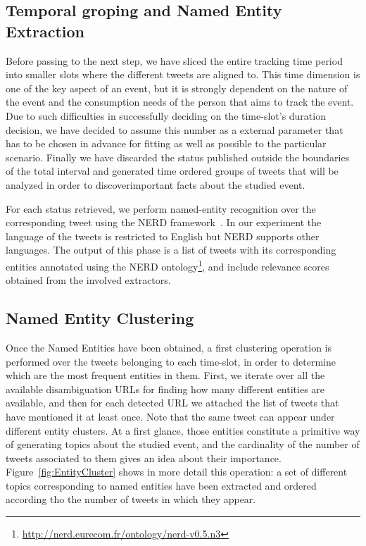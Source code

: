\documentclass{sig-alternate}
\begin{document}
\subsection{Temporal groping and Named Entity Extraction}

Before passing to the next step, we have sliced the entire tracking time period into smaller slots where the different tweets are aligned to. This time dimension is one of the key aspect of an event, but it is strongly dependent on the nature of the event and the consumption needs of the person that aims to track the event. Due to such difficulties in successfully deciding on the time-slot's duration decision, we have decided to assume this number as a external parameter that has to be chosen in advance for fitting as well as possible to the particular scenario. Finally we have discarded the status published outside the boundaries of the total interval and generated time ordered groups of tweets that will be analyzed in order to discoverimportant facts about the studied event.

For each status retrieved, we perform named-entity recognition over the corresponding tweet using the NERD framework~\cite{Rizzo2012}. In our experiment the language of the tweets is restricted to English but NERD supports other languages. The output of this phase is a list of tweets with its corresponding entities annotated using the NERD ontology\footnote{\fontsize{8pt}{1em}\selectfont \url{http://nerd.eurecom.fr/ontology/nerd-v0.5.n3}}, and include relevance scores obtained from the involved extractors. 

\subsection{Named Entity Clustering }
\label{sec:expansion}

Once the Named Entities have been obtained, a first clustering operation is performed over the tweets belonging to each time-slot, in order to determine which are the most frequent entities in them. First, we iterate over all the available disambiguation URLs for finding how many different entities are available, and then for each detected URL we attached the list of tweets that have mentioned it at least once. Note that the same tweet can appear under different entity clusters. At a first glance, those entities constitute a primitive way of generating topics about the studied event, and the cardinality of the number of tweets associated to them gives an idea about their importance. Figure~\ref{fig:EntityCluster} shows in more detail this operation: a set of different topics corresponding to named entities have been extracted and ordered according tho the number of tweets in which they appear.
\end{document}
